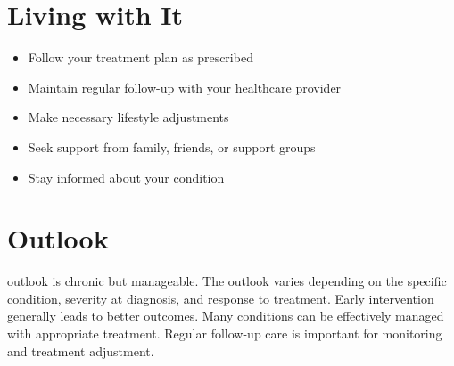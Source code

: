 \section{Living with It}
\begin{itemize}[noitemsep]
  \item Follow your treatment plan as prescribed
  \item Maintain regular follow-up with your healthcare provider
  \item Make necessary lifestyle adjustments
  \item Seek support from family, friends, or support groups
  \item Stay informed about your condition
\end{itemize}
\section{Outlook}
outlook is chronic but manageable. The outlook varies depending on the specific condition, severity at diagnosis, and response to treatment. Early intervention generally leads to better outcomes. Many conditions can be effectively managed with appropriate treatment. Regular follow-up care is important for monitoring and treatment adjustment.

